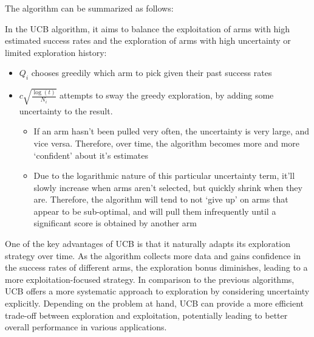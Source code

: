 The algorithm can be summarized as follows:


In the UCB algorithm, it aims to balance the exploitation of arms with high estimated success rates and the exploration of arms with high uncertainty or limited exploration history:

\begin{itemize}
    \item $Q_i$ chooses greedily which arm to pick given their past success rates
    \item $c \sqrt{\frac{\log(t)}{N_i}}$ attempts to sway the greedy exploration, by adding some uncertainty to the result.
    \begin{itemize}
        \item If an arm hasn't been pulled very often, the uncertainty is very large, and vice versa. Therefore, over time, the algorithm becomes more and more `confident' about it's estimates
        \item Due to the logarithmic nature of this particular uncertainty term, it'll slowly increase when arms aren't selected, but quickly shrink when they are. Therefore, the algorithm will tend to not `give up' on arms that appear to be sub-optimal, and will pull them infrequently until a significant score is obtained by another arm
    \end{itemize}
\end{itemize}

One of the key advantages of UCB is that it naturally adapts its exploration strategy over time. As the algorithm collects more data and gains confidence in the success rates of different arms, the exploration bonus diminishes, leading to a more exploitation-focused strategy. In comparison to the previous algorithms, UCB offers a more systematic approach to exploration by considering uncertainty explicitly. Depending on the problem at hand, UCB can provide a more efficient trade-off between exploration and exploitation, potentially leading to better overall performance in various applications.

